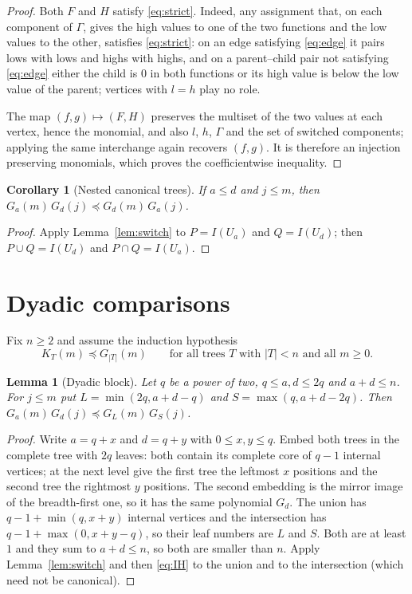 \documentclass[11pt]{amsart}
\newtheorem{lemma}[theorem]{Lemma}
\newtheorem{corollary}[theorem]{Corollary}
\theoremstyle{definition}
\theoremstyle{remark}
\newcommand{\pre}{\preceq}
\begin{document}
\begin{proof}
Both $F$ and $H$ satisfy \eqref{eq:strict}.
Indeed, any assignment that, on each component of $\Gamma$, gives the high values to one of the two functions and the low values to the other, satisfies \eqref{eq:strict}: on an edge satisfying \eqref{eq:edge} it pairs lows with lows and highs with highs, and on a parent--child pair not satisfying \eqref{eq:edge} either the child is $0$ in both functions or its high value is below the low value of the parent; vertices with $l=h$ play no role.

The map $(f,g)\mapsto(F,H)$ preserves the multiset of the two values at each vertex, hence the monomial, and also $l$, $h$, $\Gamma$ and the set of switched components; applying the same interchange again recovers $(f,g)$.
It is therefore an injection preserving monomials, which proves the coefficientwise inequality.
\end{proof}

\begin{corollary}[Nested canonical trees]\label{cor:nested}
If $a\le d$ and $j\le m$, then $G_a(m)\,G_d(j)\pre G_d(m)\,G_a(j)$.
\end{corollary}

\begin{proof}
Apply Lemma~\ref{lem:switch} to $P=I(U_a)$ and $Q=I(U_d)$; then $P\cup Q=I(U_d)$ and $P\cap Q=I(U_a)$.
\end{proof}

\section{Dyadic comparisons}\label{sec:dyadic}

Fix $n\ge 2$ and assume the induction hypothesis
\begin{equation}\label{eq:IH}
K_T(m)\pre G_{|T|}(m)\qquad\text{for all trees $T$ with $|T|<n$ and all $m\ge0$.}
\end{equation}

\begin{lemma}[Dyadic block]\label{lem:block}
Let $q$ be a power of two, $q\le a,d\le 2q$ and $a+d\le n$.
For $j\le m$ put $L=\min(2q,a+d-q)$ and $S=\max(q,a+d-2q)$.
Then $G_a(m)\,G_d(j)\pre G_L(m)\,G_S(j)$.
\end{lemma}

\begin{proof}
Write $a=q+x$ and $d=q+y$ with $0\le x,y\le q$.
Embed both trees in the complete tree with $2q$ leaves: both contain its complete core of $q-1$ internal vertices; at the next level give the first tree the leftmost $x$ positions and the second tree the rightmost $y$ positions.
The second embedding is the mirror image of the breadth-first one, so it has the same polynomial $G_d$.
The union has $q-1+\min(q,x+y)$ internal vertices and the intersection has $q-1+\max(0,x+y-q)$, so their leaf numbers are $L$ and $S$.
Both are at least $1$ and they sum to $a+d\le n$, so both are smaller than $n$.
Apply Lemma~\ref{lem:switch} and then \eqref{eq:IH} to the union and to the intersection (which need not be canonical).
\end{proof}
\end{document}
